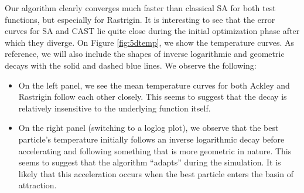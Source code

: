 \documentclass[10pt,a4paper]{article}
\theoremstyle{theorem}
\numberwithin{equation}{section}
\begin{document}
Our algorithm clearly converges much faster than classical SA for  both test functions, but especially for Rastrigin. It is interesting to see that the error curves for SA and CAST lie quite close during the initial optimization phase after which they diverge. On Figure \ref{fig:5dtemp}, we show the temperature curves. As reference, we will also include the shapes of inverse logarithmic and geometric decays with the solid and dashed blue lines. We observe the following:
\begin{itemize}
\item On the left panel, we see the mean temperature curves for both Ackley and Rastrigin follow each other closely. This seems to suggest that the decay is relatively insensitive to the underlying function itself.
\item On the right panel (switching to a loglog plot), we observe that the best particle's temperature initially follows an inverse logarithmic decay before accelerating and following something that is more geometric in nature. This seems to suggest that the algorithm ``adapts'' during the simulation. It is likely that this acceleration occurs when the best particle enters the basin of attraction.
\end{itemize}
\end{document}
